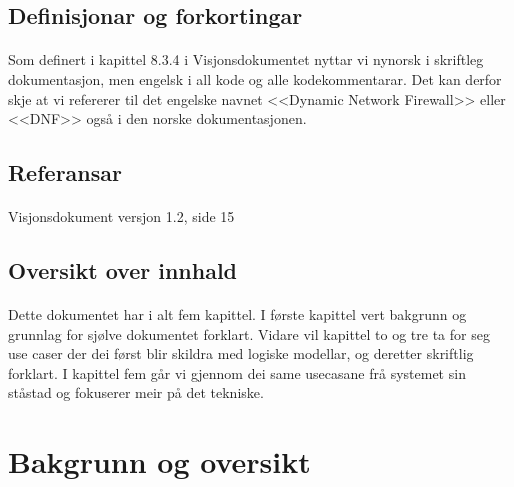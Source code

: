 \documentclass[nynorsk,12pt,a4paper]{article}
\begin{document}
\subsection{Definisjonar og forkortingar}
\paragraph{}
Som definert i kapittel 8.3.4 i Visjonsdokumentet nyttar vi nynorsk i skriftleg dokumentasjon, men engelsk i all kode og alle kodekommentarar. Det kan derfor skje at vi refererer til det engelske navnet <<Dynamic Network Firewall>> eller <<DNF>> også i den norske dokumentasjonen.

\subsection{Referansar}
\paragraph{}
Visjonsdokument versjon 1.2, side 15

\subsection{Oversikt over innhald}
\paragraph{}
Dette dokumentet har i alt fem kapittel. I første kapittel vert bakgrunn og grunnlag for sjølve dokumentet forklart. Vidare vil kapittel to og tre ta for seg use caser der dei først blir skildra med logiske modellar, og deretter skriftlig forklart. I kapittel fem går vi gjennom dei same usecasane frå systemet sin ståstad og fokuserer meir på det tekniske. 

\newpage
\section{Bakgrunn og oversikt}
\end{document}

